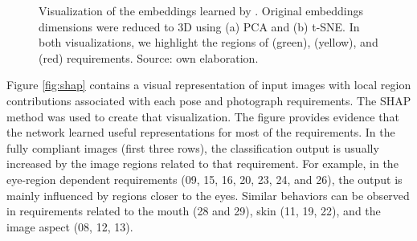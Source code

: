 \begin{figure}[ht]
\centering
{}
\caption{Visualization of the embeddings learned by \methodname. Original embeddings dimensions were reduced to 3D using (a) PCA and (b) t-SNE. In both visualizations, we highlight the regions of \variedbackground (green), \unnaturalskintone (yellow), and \veiloverface (red) requirements. Source: own elaboration.}
\label{fig:embviz}
\end{figure}

Figure \ref{fig:shap} contains a visual representation of input images with local region contributions associated with each pose and photograph requirements. The SHAP method was used to create that visualization. The figure provides evidence that the network learned useful representations for most of the requirements. In the fully compliant images (first three rows), the classification output is usually increased by the image regions related to that requirement. For example, in the eye-region dependent requirements (09, 15, 16, 20, 23, 24, and 26), the output is mainly influenced by regions closer to the eyes. Similar behaviors can be observed in requirements related to the mouth (28 and 29), skin (11, 19, 22), and the image aspect (08, 12, 13). 

